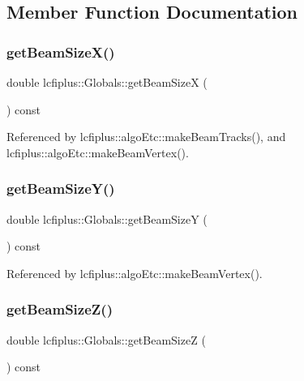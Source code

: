 \subsection{Member Function Documentation}
\mbox{\label{classlcfiplus_1_1Globals_add0213a9360bf942d60a6b4e49347e8e}} 
\subsubsection{get\+Beam\+Size\+X()}
{\footnotesize\ttfamily double lcfiplus\+::\+Globals\+::get\+Beam\+SizeX (\begin{DoxyParamCaption}{ }\end{DoxyParamCaption}) const\hspace{0.3cm}{\ttfamily [inline]}}



Referenced by lcfiplus\+::algo\+Etc\+::make\+Beam\+Tracks(), and lcfiplus\+::algo\+Etc\+::make\+Beam\+Vertex().

\mbox{\label{classlcfiplus_1_1Globals_a45a9e01ef555793deacc824687d741bc}} 
\subsubsection{get\+Beam\+Size\+Y()}
{\footnotesize\ttfamily double lcfiplus\+::\+Globals\+::get\+Beam\+SizeY (\begin{DoxyParamCaption}{ }\end{DoxyParamCaption}) const\hspace{0.3cm}{\ttfamily [inline]}}



Referenced by lcfiplus\+::algo\+Etc\+::make\+Beam\+Vertex().

\mbox{\label{classlcfiplus_1_1Globals_a3d10dca07ec02d269947b5f59169416e}} 
\subsubsection{get\+Beam\+Size\+Z()}
{\footnotesize\ttfamily double lcfiplus\+::\+Globals\+::get\+Beam\+SizeZ (\begin{DoxyParamCaption}{ }\end{DoxyParamCaption}) const\hspace{0.3cm}{\ttfamily [inline]}}



